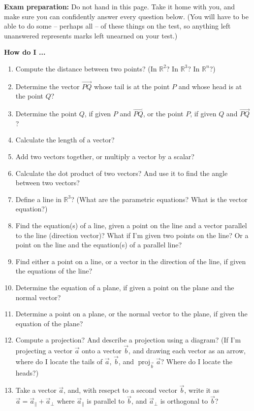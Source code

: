 \documentclass[12pt]{article}
\newcommand{\R}{\mathbb{R}}
\DeclareMathOperator{\proj}{proj}
\begin{document}
{\bf Exam preparation:} Do not hand in this page. Take it home with you, and make sure you can confidently answer every question below. (You will have to be able to do some -- perhaps all -- of these things on the test, so anything left unanswered represents marks left unearned on your test.)

\medskip

{\bf How do I ...}
\begin{enumerate}
 \item Compute the distance between two points? (In $\R^2$? In $\R^3$? In $\R^n$?)
 \item Determine the vector $\overrightarrow{PQ}$ whose tail is at the point $P$ and whose head is at the point $Q$?
 \item Determine the point $Q$, if given $P$ and $\overrightarrow{PQ}$, or the point $P$, if given $Q$ and $\overrightarrow{PQ}$?
 \item Calculate the length of a vector?
 \item Add two vectors together, or multiply a vector by a scalar?
 \item Calculate the dot product of two vectors? And use it to find the angle between two vectors?
 \item Define a line in $\R^3$? (What are the parametric equations? What is the vector equation?)
 \item Find the equation(s) of a line, given a point on the line and a vector parallel to the line (direction vector)? What if I'm given two points on the line? Or a point on the line and the equation(s) of a parallel line?
 \item Find either a point on a line, or a vector in the direction of the line, if given the equations of the line?
 \item Determine the equation of a plane, if given a point on the plane and the normal vector?
 \item Determine a point on a plane, or the normal vector to the plane, if given the equation of the plane?
 \item Compute a projection? And describe a projection using a diagram? (If I'm projecting a vector $\vec{a}$ onto a vector $\vec{b}$, and drawing each vector as an arrow, where do I locate the tails of $\vec{a}$, $\vec{b}$, and $\proj_{\vec{b}}\vec{a}$? Where do I locate the heads?)
 \item Take a vector $\vec{a}$, and, with resepct to a second vector $\vec{b}$, write it as $\vec{a} = \vec{a}_\parallel + \vec{a}_\bot$ where $\vec{a}_\parallel$ is parallel to $\vec{b}$, and $\vec{a}_\bot$ is orthogonal to $\vec{b}$?

\end{enumerate}
\end{document}
